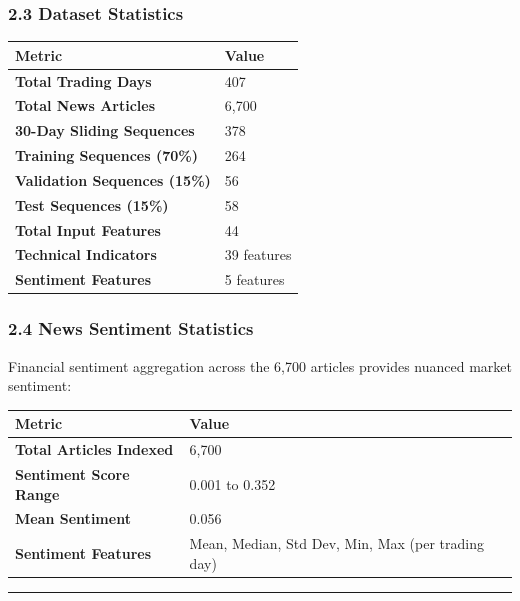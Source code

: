 \documentclass[
]{article}
\newcounter{none} %
\begin{document}
\subsubsection{2.3 Dataset Statistics}\label{23-dataset-statistics}

{\def\LTcaptype{none} %
\begin{longtable}[]{@{}ll@{}}
\toprule\noalign{}
Metric & Value \\
\midrule\noalign{}
\endhead
\bottomrule\noalign{}
\endlastfoot
\textbf{Total Trading Days} & 407 \\
\textbf{Total News Articles} & 6,700 \\
\textbf{30-Day Sliding Sequences} & 378 \\
\textbf{Training Sequences (70\%)} & 264 \\
\textbf{Validation Sequences (15\%)} & 56 \\
\textbf{Test Sequences (15\%)} & 58 \\
\textbf{Total Input Features} & 44 \\
\textbf{Technical Indicators} & 39 features \\
\textbf{Sentiment Features} & 5 features \\
\end{longtable}
}

\subsubsection{2.4 News Sentiment
Statistics}\label{24-news-sentiment-statistics}

Financial sentiment aggregation across the 6,700 articles provides
nuanced market sentiment:

{\def\LTcaptype{none} %
\begin{longtable}[]{@{}ll@{}}
\toprule\noalign{}
Metric & Value \\
\midrule\noalign{}
\endhead
\bottomrule\noalign{}
\endlastfoot
\textbf{Total Articles Indexed} & 6,700 \\
\textbf{Sentiment Score Range} & 0.001 to 0.352 \\
\textbf{Mean Sentiment} & 0.056 \\
\textbf{Sentiment Features} & Mean, Median, Std Dev, Min, Max (per
trading day) \\
\end{longtable}
}

\begin{center}\rule{0.5\linewidth}{0.5pt}\end{center}
\end{document}
